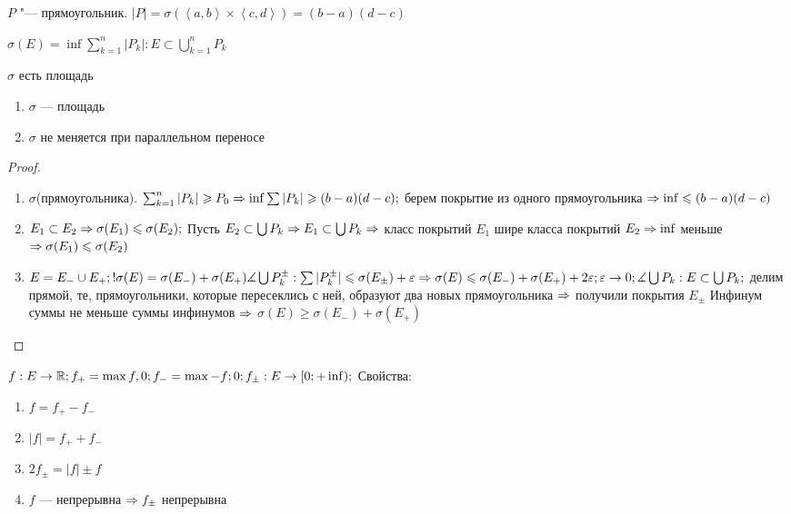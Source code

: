 \begin{Def}
	$P$ "--- прямоугольник. $|P| = \sigma(\left<a, b\right> \times \left<c, d\right>) = (b - a)(d - c)$
\end{Def}

\begin{Def}
	$\sigma(E) = \inf{\sum_{k = 1}^n |P_k|: E \subset \bigcup_{k = 1}^n P_k}$
\end{Def}

\begin{theorem}{$\sigma$ есть площадь}
	\begin{enumerate}
		\item $\sigma$ --- площадь
		\item $\sigma$ не меняется при параллельном переносе
	\end{enumerate}
\end{theorem}
\begin{proof}
	\begin{enumerate}
	\item
		$\sigma$(прямоугольника).
		$\sum_{k = 1}^n |P_k| \geqslant P_0 \Rightarrow \inf{\sum|P_k|} \geqslant (b - a)(d - c); $
		берем покрытие из одного прямоугольника $\Rightarrow \inf \leqslant (b - a)(d - c)$
	
	\item
		$E_1 \subset E_2 \Rightarrow \sigma(E_1) \leqslant \sigma(E_2); $
		Пусть $E_2 \subset \bigcup P_k \Rightarrow E_1 \subset \bigcup P_k \Rightarrow$ класс покрытий $E_1$ шире класса покрытий $E_2 \Rightarrow \inf $ меньше $\Rightarrow \sigma(E_1) \leqslant \sigma(E_2)$

	\item
		$E = E_{-} \cup E_{+}; ! \sigma(E) = \sigma(E_{-}) + \sigma(E_{+}) \measuredangle \bigcup P_k^{\pm}:
		\sum|P_k^{\pm}| \leqslant \sigma(E_{\pm}) + \varepsilon \Rightarrow \sigma(E) \leqslant \sigma(E_{-}) + \sigma(E_{+}) + 2\varepsilon;
		\varepsilon \rightarrow 0; \measuredangle \bigcup P_k: E \subset \bigcup P_k; $
		делим прямой, те, прямоугольники, которые пересеклись с ней, образуют два новых прямоугольника $\Rightarrow$ получили покрытия $E_{\pm}$
		Инфинум суммы не меньше суммы инфинумов $\Rightarrow$ $\sigma(E) \geqslant \sigma(E_{-}) + \sigma(E_{+})$

	\end{enumerate}
\end{proof}

\begin{Def}
	$f: E \rightarrow \mathbb{R} ; f_+ = \max {f, 0}; f_- = \max {-f; 0}; f_\pm : E \rightarrow [0; +\inf); $  Свойства:
	\begin{enumerate}
		\item $f = f_+ - f_- $
		\item $|f| = f_+ + f_- $
		\item $2f_\pm = |f| \pm f$
		\item $f$ --- непрерывна $ \Rightarrow f_\pm $ непрерывна
	\end{enumerate}
\end{Def}

